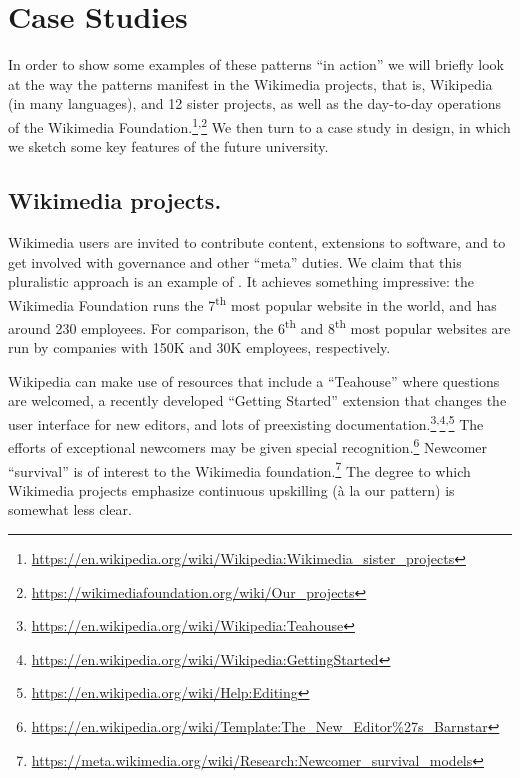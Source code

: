 \section{Case Studies}\label{sec:Case Studies}

In order to show some examples of these patterns ``in action'' we will
briefly look at the way the patterns manifest in the Wikimedia
projects, that is, Wikipedia (in many languages), and 12 sister
projects, as well as the day-to-day operations of the Wikimedia
Foundation.\footnote{\url{https://en.wikipedia.org/wiki/Wikipedia:Wikimedia_sister_projects}}\textsuperscript{,}\footnote{\url{https://wikimediafoundation.org/wiki/Our_projects}}
We then turn to a case study in design, in which we sketch some key
features of the future university.

\subsection{Wikimedia projects.}

Wikimedia users are invited to contribute content, extensions to
software, and to get involved with governance and other ``meta''
duties.  We claim that this pluralistic approach is an example of
.  It achieves something impressive: the
Wikimedia Foundation runs the 7\textsuperscript{th} most popular
website in the world, and has around 230 employees.  For comparison,
the 6\textsuperscript{th} and 8\textsuperscript{th} most popular
websites are run by companies with 150K and 30K employees,
respectively.

Wikipedia  can make use of resources that
include a ``Teahouse'' where questions are welcomed, a recently
developed ``Getting Started'' extension that changes the user
interface for new editors, and lots of preexisting
documentation.\footnote{\url{https://en.wikipedia.org/wiki/Wikipedia:Teahouse}}\textsuperscript{,}\footnote{\url{https://en.wikipedia.org/wiki/Wikipedia:GettingStarted}}\textsuperscript{,}\footnote{\url{https://en.wikipedia.org/wiki/Help:Editing}}
The efforts of exceptional newcomers may be given special
recognition.\footnote{\url{https://en.wikipedia.org/wiki/Template:The_New_Editor\%27s_Barnstar}}
Newcomer ``survival'' is of interest to the Wikimedia
foundation.\footnote{\url{https://meta.wikimedia.org/wiki/Research:Newcomer_survival_models}}
The degree to which Wikimedia projects emphasize continuous upskilling
(\`a la our  pattern) is somewhat less clear.


